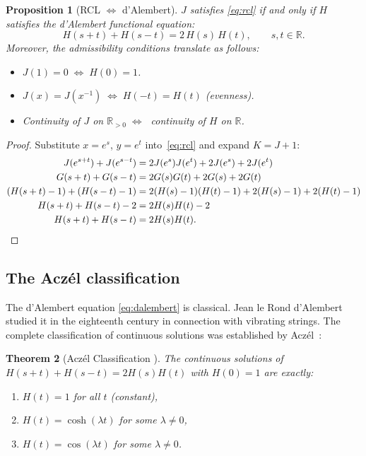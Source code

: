 \documentclass[11pt]{article}
\newcommand{\R}{\mathbb{R}}
\newcommand{\Rp}{\mathbb{R}_{>0}}
\newtheorem{theorem}{Theorem}[section]
\newtheorem{proposition}[theorem]{Proposition}
\theoremstyle{definition}
\theoremstyle{remark}
\begin{document}
\begin{proposition}[RCL $\Leftrightarrow$ d'Alembert]
\label{prop:dalembert-equiv}
$J$ satisfies \eqref{eq:rcl} if and only if $H$ satisfies the
d'Alembert functional equation:
\begin{equation}\label{eq:dalembert}
H(s + t) + H(s - t) = 2\,H(s)\,H(t),
\qquad s, t \in \R.
\end{equation}
Moreover, the admissibility conditions translate as follows:
\begin{itemize}
\item $J(1) = 0 \;\Leftrightarrow\; H(0) = 1$.
\item $J(x) = J(x^{-1}) \;\Leftrightarrow\; H(-t) = H(t)$
  \textup{(}evenness\textup{)}.
\item Continuity of $J$ on $\Rp \;\Leftrightarrow\;$
  continuity of $H$ on $\R$.
\end{itemize}
\end{proposition}
\begin{proof}
Substitute $x = e^s$, $y = e^t$ into~\eqref{eq:rcl} and expand
$K = J + 1$:
\begin{align*}
J(e^{s+t}) + J(e^{s-t})
&= 2J(e^s)J(e^t) + 2J(e^s) + 2J(e^t) \\
G(s+t) + G(s-t)
&= 2G(s)G(t) + 2G(s) + 2G(t) \\
(H(s+t) - 1) + (H(s-t) - 1)
&= 2(H(s)-1)(H(t)-1) + 2(H(s)-1) + 2(H(t)-1) \\
H(s+t) + H(s-t) - 2
&= 2H(s)H(t) - 2 \\
H(s+t) + H(s-t)
&= 2H(s)H(t). \qedhere
\end{align*}
\end{proof}

\subsection{The Acz\'el classification}

The d'Alembert equation \eqref{eq:dalembert} is classical.
Jean le Rond d'Alembert studied it in the eighteenth century
in connection with vibrating strings.
The complete classification of continuous solutions was established
by Acz\'el~\cite{Aczel1966}:

\begin{theorem}[Acz\'el Classification {\cite[Ch.~3]{Aczel1966}}]
\label{thm:aczel}
The continuous solutions of
$H(s+t) + H(s-t) = 2H(s)H(t)$ with $H(0) = 1$ are exactly:
\begin{enumerate}
\item[\textup{(i)}] $H(t) = 1$ for all $t$
  \;\textup{(}constant\textup{)},
\item[\textup{(ii)}] $H(t) = \cosh(\lambda t)$ for some
  $\lambda \neq 0$,
\item[\textup{(iii)}] $H(t) = \cos(\lambda t)$ for some
  $\lambda \neq 0$.
\end{enumerate}
\end{theorem}
\end{document}
